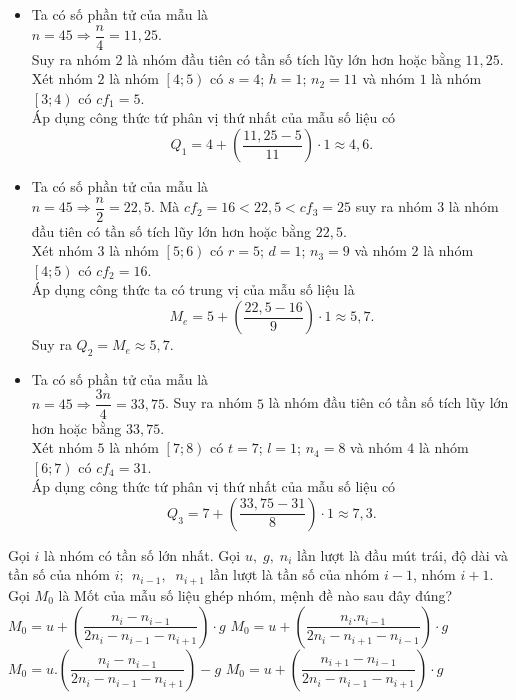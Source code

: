 \begin{ex}
{		\begin{itemize}
			\item Ta có số phần tử của mẫu là\\
			$n=45\Rightarrow \dfrac{n}{4}=11{,}25$.\\
			Suy ra nhóm $2$ là nhóm đầu tiên có tần số tích lũy lớn hơn hoặc bằng $11{,}25$.\\
			Xét nhóm $2$ là nhóm $\left[4; 5\right)$ có $s=4$; $h=1$; $n_2=11$ và nhóm $1$ là nhóm $\left[3; 4\right)$ có $cf_1=5$.\\
			Áp dụng công thức tứ phân vị thứ nhất của mẫu số liệu có
			\[Q_1=4+\left(\dfrac{11,25-5}{11} \right)\cdot 1\approx 4{,}6.\]
			\item Ta có số phần tử của mẫu là\\
			$n=45\Rightarrow \dfrac{n}{2}=22{,}5$.
			Mà $cf_2=16< 22{,}5< cf_3=25$ suy ra nhóm $3$ là nhóm đầu tiên có tần số tích lũy lớn hơn hoặc bằng $22{,}5$.\\
			Xét nhóm $3$ là nhóm $\left[5; 6\right)$ có $r=5$; $d=1$; $n_3=9$ và nhóm $2$ là nhóm $\left[4; 5\right)$ có $cf_2=16$.\\
			Áp dụng công thức ta có trung vị của mẫu số liệu là
			\[M_e=5+\left(\dfrac{22{,}5-16}{9} \right)\cdot 1\approx 5{,}7.\]
			Suy ra $Q_2=M_e \approx 5{,}7$.
			\item Ta có số phần tử của mẫu là\\
			$n=45\Rightarrow \dfrac{3n}{4}=33{,}75$.
			Suy ra nhóm $5$ là nhóm đầu tiên có tần số tích lũy lớn hơn hoặc bằng $33{,}75$.\\
			Xét nhóm $5$ là nhóm $\left[7; 8\right)$ có $t=7$; $l=1$; $n_4=8$ và nhóm $4$ là nhóm $\left[6; 7\right)$ có $cf_4=31$.\\
			Áp dụng công thức tứ phân vị thứ nhất của mẫu số liệu có
			\[Q_3=7+\left(\dfrac{33{,}75-31}{8} \right)\cdot 1\approx 7{,}3.\]
		\end{itemize}
	}
\end{ex}

\begin{ex}%
	Gọi $i$ là nhóm có tần số lớn nhất. Gọi $u,\; g,\; n_i$ lần lượt là đầu mút trái, độ dài và tần số của nhóm $i$; $\; n_{i-1}, \; \; n_{i+1}$ lần lượt là tần số của nhóm $i-1$, nhóm $i+1$. Gọi $M_0$ là Mốt của mẫu số liệu ghép nhóm, mệnh đề nào sau đây đúng?
	\choice
	{\True $M_0=u+\left(\dfrac{n_i-n_{i-1}}{2n_i-n_{i-1}-n_{i+1}} \right)\cdot g$}
	{$M_0=u+\left(\dfrac{n_i.n_{i-1}}{2n_i-n_{i+1}-n_{i-1}} \right)\cdot g$}
	{$M_0=u.\left(\dfrac{n_i-n_{i-1}}{2n_i-n_{i-1}-n_{i+1}} \right)-g$}
	{$M_0=u+\left(\dfrac{n_{i+1}-n_{i-1}}{2n_i-n_{i-1}-n_{i+1}} \right)\cdot g$}
\end{ex}

